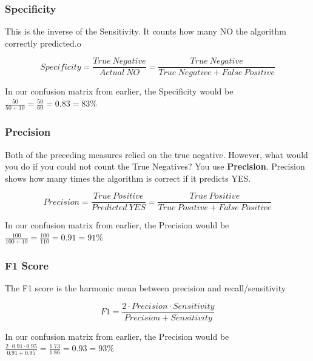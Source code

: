 \documentclass[11pt]{article}
\begin{document}
\subsubsection{Specificity}
This is the inverse of the Sensitivity. It counts how many NO the algorithm correctly predicted.o

\begin{equation}
    Specificity= \frac{True\ Negative}{Actual\ NO} = \frac{True\ Negative}{True\ Negative + False\ Positive}
\end{equation}

\vspace{10px}

In our confusion matrix from earlier, the Specificity would be $\frac{50}{50+ 10} = \frac{50}{60} = 0.83 = 83\%$

\subsubsection{Precision}
Both of the preceding measures relied on the true negative. However, what would you do if you could not count the True Negatives? You use \textbf{Precision}. Precision shows how many times the algorithm is correct if it predicts YES.

\begin{equation}
    Precision = \frac{True\ Positive}{Predicted\ YES} = \frac{True\ Positive}{True\ Positive + False\ Positive}
\end{equation}

\vspace{10px}

In our confusion matrix from earlier, the Precision would be $\frac{100}{100+ 10} = \frac{100}{110} = 0.91 = 91\%$

\subsubsection{F1 Score}

The F1 score is the harmonic mean between precision and recall/sensitivity

\begin{equation}
    F1 = \frac{2 \cdot Precision \cdot Sensitivity}{Precision + Sensitivity}
\end{equation}

In our confusion matrix from earlier, the Precision would be $\frac{2 \cdot 0.91 \cdot 0.95}{0.91 + 0.95} = \frac{1.73}{1.86} = 0.93 = 93\%$

\vspace{10px}
\end{document}
